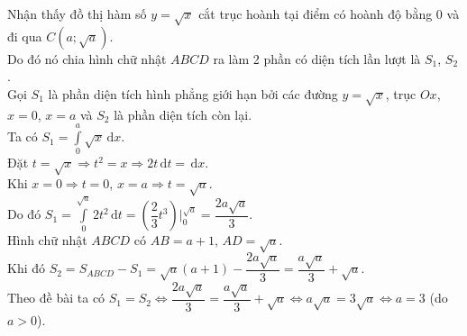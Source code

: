 \begin{ex}
{		Nhận thấy đồ thị hàm số $y=\sqrt{x}$ cắt trục hoành tại điểm có hoành độ bằng $0$ và đi qua $C(a;\sqrt{a}).$\\
		Do đó nó chia hình chữ nhật $ABCD$ ra làm 2 phần có diện tích lần lượt là $S_1$, $S_2$.\\
		Gọi $S_1$ là phần diện tích hình phẳng giới hạn bởi các đường $y=\sqrt{x}$, trục $Ox$, $x=0$, $x=a$ và $S_2$ là phần diện tích còn lại.\\
		Ta có $S_1=\displaystyle\int\limits_{0}^{a} \sqrt{x} \mathrm{\,d}x$.\\
		Đặt $t=\sqrt{x}\Rightarrow t^2=x\Rightarrow 2t\mathrm{\,d}t =\mathrm{\,d}x$.\\
		Khi $x=0\Rightarrow t=0$, $x=a\Rightarrow t=\sqrt{a}$.\\
		Do đó $S_1=\displaystyle\int\limits_{0}^{\sqrt{a}} 2t^2 \mathrm{\,d}t =\left(\dfrac{2}{3}t^3\right)\bigg |_0^{\sqrt{a}}=\dfrac{2a\sqrt{a}}{3}$.\\
		Hình chữ nhật $ABCD$ có $AB=a+1$, $AD=\sqrt{a}$.\\
		Khi đó $S_2=S_{ABCD}-S_1=\sqrt{a}(a+1)-\dfrac{2a\sqrt{a}}{3}=\dfrac{a\sqrt{a}}{3}+\sqrt{a}$.\\
		Theo đề bài ta có $S_1=S_2\Leftrightarrow \dfrac{2a\sqrt{a}}{3}=\dfrac{a\sqrt{a}}{3}+\sqrt{a}\Leftrightarrow a\sqrt{a}=3\sqrt{a}\Leftrightarrow a=3$ (do $a>0$).
	}
\end{ex}
